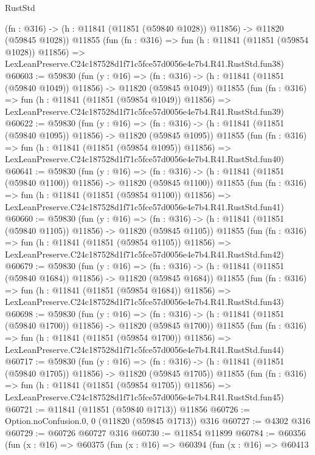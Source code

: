 \begin{lexlean}{RustStd}
\begin{coremodule}
    (fn : @316) -> (h : @11841 (@11851 (@59840 @1028)) @11856) -> @11820 (@59845 @1028))
    @11855
    (fun (fn : @316) =>
    fun (h : @11841 (@11851 (@59854 @1028)) @11856) =>
    LexLeanPreserve.C24c187528d1f71c5fce57d0056e4e7b4.R41.RustStd.fun38)
@60603 := @59830
    (fun (y : @16) =>
    (fn : @316) -> (h : @11841 (@11851 (@59840 @1049)) @11856) -> @11820 (@59845 @1049))
    @11855
    (fun (fn : @316) =>
    fun (h : @11841 (@11851 (@59854 @1049)) @11856) =>
    LexLeanPreserve.C24c187528d1f71c5fce57d0056e4e7b4.R41.RustStd.fun39)
@60622 := @59830
    (fun (y : @16) =>
    (fn : @316) -> (h : @11841 (@11851 (@59840 @1095)) @11856) -> @11820 (@59845 @1095))
    @11855
    (fun (fn : @316) =>
    fun (h : @11841 (@11851 (@59854 @1095)) @11856) =>
    LexLeanPreserve.C24c187528d1f71c5fce57d0056e4e7b4.R41.RustStd.fun40)
@60641 := @59830
    (fun (y : @16) =>
    (fn : @316) -> (h : @11841 (@11851 (@59840 @1100)) @11856) -> @11820 (@59845 @1100))
    @11855
    (fun (fn : @316) =>
    fun (h : @11841 (@11851 (@59854 @1100)) @11856) =>
    LexLeanPreserve.C24c187528d1f71c5fce57d0056e4e7b4.R41.RustStd.fun41)
@60660 := @59830
    (fun (y : @16) =>
    (fn : @316) -> (h : @11841 (@11851 (@59840 @1105)) @11856) -> @11820 (@59845 @1105))
    @11855
    (fun (fn : @316) =>
    fun (h : @11841 (@11851 (@59854 @1105)) @11856) =>
    LexLeanPreserve.C24c187528d1f71c5fce57d0056e4e7b4.R41.RustStd.fun42)
@60679 := @59830
    (fun (y : @16) =>
    (fn : @316) -> (h : @11841 (@11851 (@59840 @1684)) @11856) -> @11820 (@59845 @1684))
    @11855
    (fun (fn : @316) =>
    fun (h : @11841 (@11851 (@59854 @1684)) @11856) =>
    LexLeanPreserve.C24c187528d1f71c5fce57d0056e4e7b4.R41.RustStd.fun43)
@60698 := @59830
    (fun (y : @16) =>
    (fn : @316) -> (h : @11841 (@11851 (@59840 @1700)) @11856) -> @11820 (@59845 @1700))
    @11855
    (fun (fn : @316) =>
    fun (h : @11841 (@11851 (@59854 @1700)) @11856) =>
    LexLeanPreserve.C24c187528d1f71c5fce57d0056e4e7b4.R41.RustStd.fun44)
@60717 := @59830
    (fun (y : @16) =>
    (fn : @316) -> (h : @11841 (@11851 (@59840 @1705)) @11856) -> @11820 (@59845 @1705))
    @11855
    (fun (fn : @316) =>
    fun (h : @11841 (@11851 (@59854 @1705)) @11856) =>
    LexLeanPreserve.C24c187528d1f71c5fce57d0056e4e7b4.R41.RustStd.fun45)
@60721 := @11841 (@11851 (@59840 @1713)) @11856
@60726 := Option.noConfusion.{0, 0} (@11820 (@59845 @1713)) @316
@60727 := @4302 @316
@60729 := @60726 @60727 @316
@60730 := @11854 @11899
@60784 := @60356
    (fun (x : @16) =>
    @60375
      (fun (x : @16) =>
      @60394
        (fun (x : @16) =>
        @60413

\end{coremodule}
\end{lexlean}
